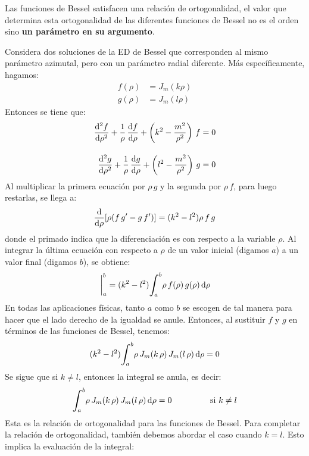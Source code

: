 \documentclass[12pt]{article}
\newcommand{\pderivada}[1]{\ensuremath{{#1}^{\prime}}}
\def\scaleint#1{\vcenter{\hbox{\scaleto[3ex]{\displaystyle\int}{#1}}}}
\def\bs{\mkern-12mu}
\numberwithin{equation}{section}
\begin{document}
Las funciones de Bessel satisfacen una relación de ortogonalidad, el valor que determina esta ortogonalidad de las diferentes funciones de Bessel no es el orden sino \textbf{un parámetro en su argumento}.
\par
Considera dos soluciones de la ED de Bessel que corresponden al mismo parámetro azimutal, pero con un parámetro radial diferente. Más específicamente, hagamos:
\begin{align*}
f(\rho) &= J_{m} (k \rho) \\[0.5em]
g(\rho) &= J_{m} (l \rho)
\end{align*}
Entonces se tiene que:
\begin{align*}
\dv[2]{f}{\rho} + \dfrac{1}{\rho} \, \dv{f}{\rho} + \left( k^{2} - \dfrac{m^{2}}{\rho^{2}} \right) \, f &= 0 \\[1em] 
\dv[2]{g}{\rho} + \dfrac{1}{\rho} \, \dv{g}{\rho} + \left( l^{2} - \dfrac{m^{2}}{\rho^{2}} \right) \, g &= 0
\end{align*}
Al multiplicar la primera ecuación por $\rho \, g$ y la segunda por $\rho \, f$, para luego restarlas, se llega a:
\begin{align*}
\dv{\rho} [\rho (f \, g^{\prime} - g \, f^{\prime} ) ] = (k^{2} - l^{2}) \rho \, f \, g
\end{align*}
donde el primado indica que la diferenciación es con respecto a la variable $\rho$. Al integrar la última ecuación con respecto a $\rho$ de un valor inicial (digamos $a$) a un valor final (digamos $b$), se obtiene:
\begin{align*}
[\rho (f \, \pderivada{g} - g \, \pderivada{f} ) ]\eval_{a}^{b} = (k^{2} - l^{2}) \scaleint{6ex}_{\bs a}^{b} \rho \, f(\rho) \, g(\rho) \dd{\rho}
\end{align*}
En todas las aplicaciones físicas, tanto $a$ como $b$ se escogen de tal manera para hacer que el lado derecho de la igualdad se anule. Entonces, al sustituir $f$ y $g$ en términos de las funciones de Bessel, tenemos:
\begin{align*}
(k^{2} - l^{2}) \scaleint{6ex}_{\bs a}^{b} \rho \, J_{m} (k \, \rho) \, J_{m}(l \, \rho) \dd{\rho} = 0
\end{align*}
Se sigue que si $k \neq l$, entonces la integral se anula, es decir:
\begin{align}
\scaleint{6ex}_{\bs a}^{b} \rho \, J_{m} (k \, \rho) \, J_{m}(l \, \rho) \dd{\rho} = 0 \hspace{1.5cm} \mbox{ si } k \neq l
\label{eq:ecuacion_27_20}
\end{align}
Esta es la relación de ortogonalidad para las funciones de Bessel. Para completar la relación de ortogonalidad, también debemos abordar el caso cuando $k = l$. Esto implica la evaluación de la integral:
\end{document}
